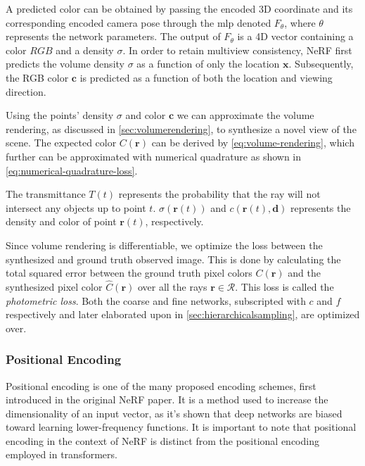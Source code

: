 

A predicted color can be obtained by passing the encoded 3D coordinate and its corresponding encoded camera pose through the \acrshort{mlp} denoted $F_{\theta}$, where $\theta$ represents the network parameters. The output of $F_\theta$ is a 4D vector containing a color $RGB$ and a density $\sigma$. In order to retain multiview consistency, NeRF first predicts the volume density $\sigma$ as a function of only the location $\textbf{x}$. Subsequently, the RGB color $\pmb{c}$ is predicted as a function of both the location and viewing direction.


Using the points' density $\sigma$ and color $\pmb{c}$ we can approximate the volume rendering, as discussed in \autoref{sec:volumerendering}, to synthesize a novel view of the scene. The expected color $C(\pmb{r})$ can be derived by \autoref{eq:volume-rendering}, which further can be approximated with numerical quadrature as shown in \autoref{eq:numerical-quadrature-loss}.





The transmittance $T(t)$ represents the probability that the ray will not intersect any objects up to point $t$. $\sigma(\pmb{r}(t))$ and $c(\pmb{r}(t), \pmb{d})$ represents the density and color of point $\pmb{r}(t)$, respectively.

Since volume rendering is differentiable, we optimize the loss between the synthesized and ground truth observed image. This is done by calculating the total squared error between the ground truth pixel colors $C(\pmb{r})$ and the synthesized pixel color $\hat{C}(\pmb{r})$ over all the rays $\pmb{r} \in \mathcal{R}$. This loss is called the \textit{photometric loss}. Both the coarse and fine networks, subscripted with $c$ and $f$ respectively and later elaborated upon in \autoref{sec:hierarchicalsampling}, are optimized over.



\subsubsection{Positional Encoding} \label{sec:positionalencoding}
Positional encoding is one of the many proposed encoding schemes, first introduced in the original NeRF paper. It is a method used to increase the dimensionality of an input vector, as it's shown that deep networks are biased toward learning lower-frequency functions. It is important to note that positional encoding in the context of NeRF is distinct from the positional encoding employed in transformers.


